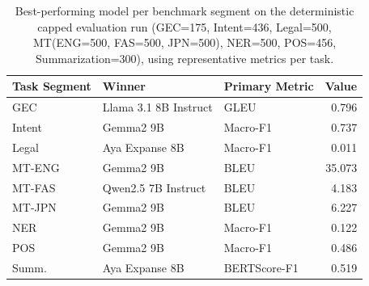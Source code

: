 \begin{table}[t]
\centering
\caption{Best-performing model per benchmark segment on the deterministic capped evaluation run (GEC=175, Intent=436, Legal=500, MT(ENG=500, FAS=500, JPN=500), NER=500, POS=456, Summarization=300), using representative metrics per task.}
\label{tab:capped-task-winners}
\begin{tabular}{lllr}
\toprule
Task Segment & Winner & Primary Metric & Value \\
\midrule
GEC & Llama 3.1 8B Instruct & GLEU & 0.796 \\
Intent & Gemma2 9B & Macro-F1 & 0.737 \\
Legal & Aya Expanse 8B & Macro-F1 & 0.011 \\
MT-ENG & Gemma2 9B & BLEU & 35.073 \\
MT-FAS & Qwen2.5 7B Instruct & BLEU & 4.183 \\
MT-JPN & Gemma2 9B & BLEU & 6.227 \\
NER & Gemma2 9B & Macro-F1 & 0.122 \\
POS & Gemma2 9B & Macro-F1 & 0.486 \\
Summ. & Aya Expanse 8B & BERTScore-F1 & 0.519 \\
\bottomrule
\end{tabular}
\end{table}
